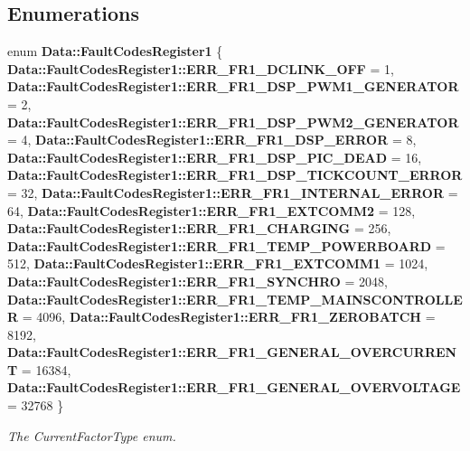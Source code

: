 \subsection*{Enumerations}
\begin{DoxyCompactItemize}
\item 
enum \textbf{ Data\+::\+Fault\+Codes\+Register1} \{ \newline
\textbf{ Data\+::\+Fault\+Codes\+Register1\+::\+E\+R\+R\+\_\+\+F\+R1\+\_\+\+D\+C\+L\+I\+N\+K\+\_\+\+O\+FF} = 1, 
\textbf{ Data\+::\+Fault\+Codes\+Register1\+::\+E\+R\+R\+\_\+\+F\+R1\+\_\+\+D\+S\+P\+\_\+\+P\+W\+M1\+\_\+\+G\+E\+N\+E\+R\+A\+T\+OR} = 2, 
\textbf{ Data\+::\+Fault\+Codes\+Register1\+::\+E\+R\+R\+\_\+\+F\+R1\+\_\+\+D\+S\+P\+\_\+\+P\+W\+M2\+\_\+\+G\+E\+N\+E\+R\+A\+T\+OR} = 4, 
\textbf{ Data\+::\+Fault\+Codes\+Register1\+::\+E\+R\+R\+\_\+\+F\+R1\+\_\+\+D\+S\+P\+\_\+\+E\+R\+R\+OR} = 8, 
\newline
\textbf{ Data\+::\+Fault\+Codes\+Register1\+::\+E\+R\+R\+\_\+\+F\+R1\+\_\+\+D\+S\+P\+\_\+\+P\+I\+C\+\_\+\+D\+E\+AD} = 16, 
\textbf{ Data\+::\+Fault\+Codes\+Register1\+::\+E\+R\+R\+\_\+\+F\+R1\+\_\+\+D\+S\+P\+\_\+\+T\+I\+C\+K\+C\+O\+U\+N\+T\+\_\+\+E\+R\+R\+OR} = 32, 
\textbf{ Data\+::\+Fault\+Codes\+Register1\+::\+E\+R\+R\+\_\+\+F\+R1\+\_\+\+I\+N\+T\+E\+R\+N\+A\+L\+\_\+\+E\+R\+R\+OR} = 64, 
\textbf{ Data\+::\+Fault\+Codes\+Register1\+::\+E\+R\+R\+\_\+\+F\+R1\+\_\+\+E\+X\+T\+C\+O\+M\+M2} = 128, 
\newline
\textbf{ Data\+::\+Fault\+Codes\+Register1\+::\+E\+R\+R\+\_\+\+F\+R1\+\_\+\+C\+H\+A\+R\+G\+I\+NG} = 256, 
\textbf{ Data\+::\+Fault\+Codes\+Register1\+::\+E\+R\+R\+\_\+\+F\+R1\+\_\+\+T\+E\+M\+P\+\_\+\+P\+O\+W\+E\+R\+B\+O\+A\+RD} = 512, 
\textbf{ Data\+::\+Fault\+Codes\+Register1\+::\+E\+R\+R\+\_\+\+F\+R1\+\_\+\+E\+X\+T\+C\+O\+M\+M1} = 1024, 
\textbf{ Data\+::\+Fault\+Codes\+Register1\+::\+E\+R\+R\+\_\+\+F\+R1\+\_\+\+S\+Y\+N\+C\+H\+RO} = 2048, 
\newline
\textbf{ Data\+::\+Fault\+Codes\+Register1\+::\+E\+R\+R\+\_\+\+F\+R1\+\_\+\+T\+E\+M\+P\+\_\+\+M\+A\+I\+N\+S\+C\+O\+N\+T\+R\+O\+L\+L\+ER} = 4096, 
\textbf{ Data\+::\+Fault\+Codes\+Register1\+::\+E\+R\+R\+\_\+\+F\+R1\+\_\+\+Z\+E\+R\+O\+B\+A\+T\+CH} = 8192, 
\textbf{ Data\+::\+Fault\+Codes\+Register1\+::\+E\+R\+R\+\_\+\+F\+R1\+\_\+\+G\+E\+N\+E\+R\+A\+L\+\_\+\+O\+V\+E\+R\+C\+U\+R\+R\+E\+NT} = 16384, 
\textbf{ Data\+::\+Fault\+Codes\+Register1\+::\+E\+R\+R\+\_\+\+F\+R1\+\_\+\+G\+E\+N\+E\+R\+A\+L\+\_\+\+O\+V\+E\+R\+V\+O\+L\+T\+A\+GE} = 32768
 \}\begin{DoxyCompactList}\small\item\em The Current\+Factor\+Type enum. \end{DoxyCompactList}
\end{DoxyCompactItemize}
